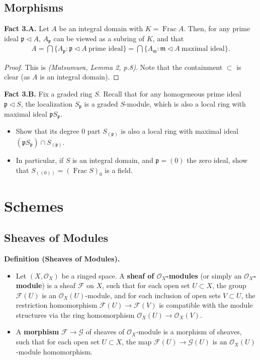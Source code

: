 \documentclass[11pt,a4paper,footinclude=true,headinclude=true]{scrbook} %
\DeclareMathOperator{\Frac}{Frac}
\newcommand{\FF}{\mathscr{F}}
\newcommand{\GG}{\mathscr{G}}
\newcommand{\OO}{\mathcal{O}}
\newcommand{\pp}{\mathfrak{p}}
\newcommand{\mm}{\mathfrak{m}}
\newcommand{\<}{\langle}
\newcommand{\>}{\rangle}
\newenvironment{definition}[2][Definition]
    { \begin{mdframed}[backgroundcolor=gray!20] \textbf{#1 #2.}\ }
    {  \end{mdframed}}
\newenvironment{fact}[2][Fact]
    { \begin{mdframed}[backgroundcolor=gray!20] \textbf{#1 #2.} }
    {  \end{mdframed}}
\begin{document}
\chapter{Morphisms}

\begin{fact}{3.A}
    Let $A$ be an integral domain with $K=\Frac A$. Then, for any prime ideal $\pp\triangleleft A$, $A_\pp$ can be viewed as a subring of $K$, and that
    \begin{align*}
        A=\bigcap\{A_\pp:\pp\triangleleft A\ \text{prime ideal}\}=\bigcap\{A_\mm:\mm\triangleleft A\ \text{maximal ideal}\}.
    \end{align*}
\end{fact}
\begin{proof}
    This is \textit{(Matsumura, Lemma 2, p.8)}. Note that the containment $\subset$ is clear (as $A$ is an integral domain).
\end{proof}

\begin{fact}{3.B}
     Fix a graded ring $S$. Recall that for any homogeneous prime ideal $\pp\triangleleft S$, the localization $S_\pp$ is a graded $S$-module, which is also a local ring with maximal ideal $\pp S_\pp$.
     \begin{itemize}
         \item Show that its degree $0$ part $S_{(\pp)}$ is also a local ring with maximal ideal $(\pp S_\pp)\cap S_{(\pp)}$.
         \item In particular, if $S$ is an integral domain, and $\pp=(0)$ the zero ideal, show that $S_{((0))}=(\Frac S)_0$ is a field.
     \end{itemize}
\end{fact}

\cleardoublepage\part{Schemes}

\chapter{Sheaves of Modules}

\begin{definition}{(Sheaves of Modules)}
    \begin{itemize}
        \item Let $(X,\OO_X)$ be a ringed space. A \textbf{sheaf of $\OO_X$-modules} (or simply an \textbf{$\OO_X$-module}) is a sheaf $\FF$ on $X$, such that for each open set $U\subset X$, the group $\FF(U)$ is an $\OO_X(U)$-module, and for each inclusion of open sets $V\subset U$, the restriction homomorphism $\FF(U)\rightarrow\FF(V)$ is compatible with the module structures via the ring homomorphism $\OO_X(U)\rightarrow\OO_X(V)$.
        \item A \textbf{morphism} $\FF\to\GG$ of sheaves of $\OO_X$-module is a morphism of sheaves, such that for each open set $U\subset X$, the map $\FF(U)\to\GG(U)$ is an $\OO_X(U)$-module homomorphism.
    \end{itemize}
\end{definition}
 
\end{document}

